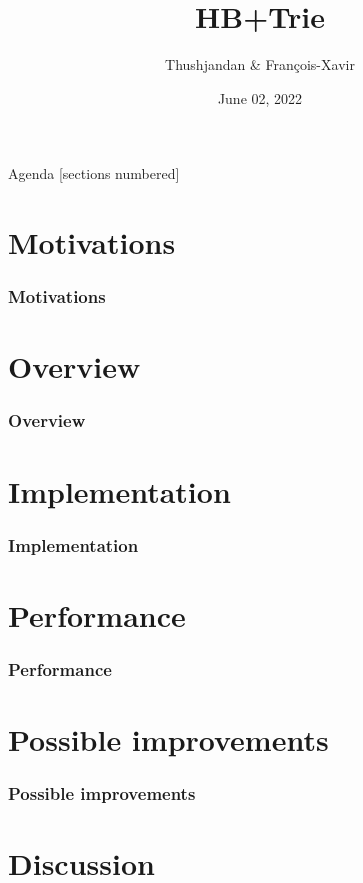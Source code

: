 \documentclass[aspectratio=169]{beamer}
\title{HB+Trie}
\date{June 02, 2022}
\author{Thushjandan \& François-Xavir}
\institute{Data Management Data Structures}
\begin{document}
\maketitle

\begin{frame}{Agenda}
    [sections numbered]
    \tableofcontents
\end{frame}
\section{Motivations}
\begin{frame}[t]
    \frametitle{Motivations}
\end{frame}
\section{Overview}
\begin{frame}[t]
    \frametitle{Overview}
\end{frame}
\section{Implementation}
\begin{frame}[t]
    \frametitle{Implementation}
\end{frame}
\section{Performance}
\begin{frame}[t]
    \frametitle{Performance}
\end{frame}
\section{Possible improvements}
\begin{frame}[t]
    \frametitle{Possible improvements}
\end{frame}
\section{Discussion}
\end{document}
